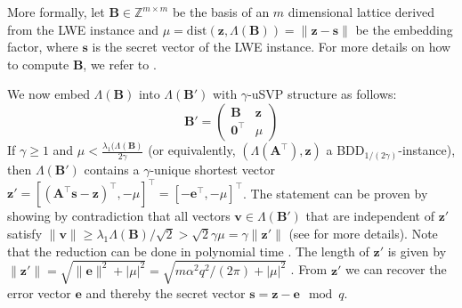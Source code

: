 More formally, let $\mathbf{B} \in \mathbb{Z}^{m \times m}$ be the basis of an $m$ dimensional lattice derived from the LWE instance and $\mu = \text{dist}(\mathbf{z}, \Lambda(\mathbf{B})) = \| \mathbf{z} - \mathbf{s}\|$ be the embedding factor, where $\mathbf{s}$ is the secret vector of the LWE instance. For more details on how to compute $\mathbf{B}$, we refer to \cite{AFG13}. %

We now embed $\Lambda(\mathbf{B})$ into $\Lambda(\mathbf{B}')$ with $\gamma$-uSVP structure as follows: %
\begin{equation}
  \mathbf{B}' = \begin{pmatrix}
    \mathbf{B}           & \mathbf{z} \\
    \mathbf{0}^\intercal & \mu
  \end{pmatrix}
\end{equation}
If $\gamma \geq 1$ and $\mu < \frac{\lambda_1(\Lambda(\mathbf{B})}{2\gamma}$ (or equivalently, $(\Lambda(\mathbf{A}^\intercal), \mathbf{z})$ a BDD$_{1/(2\gamma)}$-instance), then $\Lambda(\mathbf{B}')$ contains a $\gamma$-unique shortest vector $\mathbf{z}' = \left[(\mathbf{A}^\intercal\mathbf{s} - \mathbf{z})^\intercal, -\mu\right]^\intercal = \left[-\mathbf{e}^\intercal, -\mu\right]^\intercal$.
The statement can be proven by showing by contradiction that all vectors $\mathbf{v} \in \Lambda(\mathbf{B}')$ that are independent of $\mathbf{z}'$ satisfy $\| \mathbf{v}\| \geq \lambda_1{\Lambda(\mathbf{B})}/\sqrt{2} > \sqrt{2}\gamma \mu = \gamma \|\mathbf{z}'\|$ (see \cite[Section~4]{LM09} for more details). Note that the reduction can be done in polynomial time \cite[Theorem~4.1]{LM09}. %
The length of $\mathbf{z}'$ is given by $\|\mathbf{z}'\| = \sqrt{\|\mathbf{e}\|^2 + | \mu |^2} = \sqrt{m\alpha^2 q^2/(2\pi) + | \mu |^2}$ \cite{BBGS19}. From $\mathbf{z}'$ we can recover the error vector $\mathbf{e}$ and thereby the secret vector $\mathbf{s} = \mathbf{z} - \mathbf{e} \mod q$.

